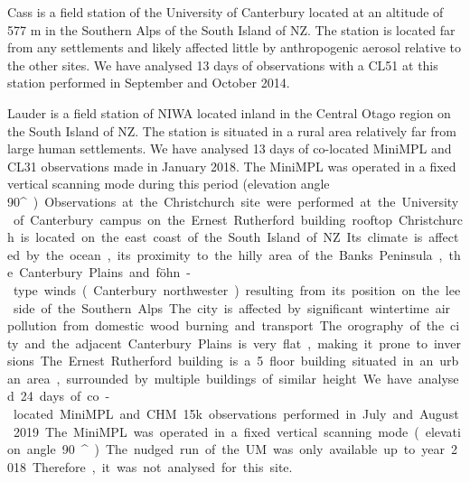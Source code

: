 \begin{table}[t]
\caption[Location of sites and instruments]{Location of sites and instruments. The time periods are inclusive.}
\label{tab:3:case-studies}
\centering
{}
\end{table}

Cass is a field station of the University of Canterbury
located at an altitude of 577 m in the Southern Alps
of the South Island of NZ. The station is located far from any 
settlements and likely affected little by anthropogenic aerosol relative to the
other sites. We have analysed
13 days of observations with a CL51 at this station performed in September
and October 2014.

Lauder is a field station of NIWA located
inland in the Central Otago region on the South Island of NZ.
The station is situated in a rural area relatively far from large human
settlements. We have analysed 13 days of co-located MiniMPL and CL31
observations made in January 2018. The MiniMPL was operated in a fixed
vertical scanning mode during this period (elevation angle 90\unit{^\circ}).

Observations at the Christchurch site were performed at the
University of Canterbury campus on the Ernest Rutherford building rooftop.
Christchurch is located on the east coast of the South Island of NZ.
Its climate is affected by the ocean, its proximity to the hilly area
of the Banks Peninsula, the Canterbury Plains and föhn-type winds (Canterbury northwester)
resulting from its position on the lee side of the Southern Alps. The city is affected by
significant wintertime air pollution from domestic wood burning and transport.
The orography of the city and the adjacent Canterbury Plains is very flat,
making it prone to inversions. The Ernest Rutherford building is a 5 floor
building situated in an urban area, surrounded by multiple buildings of similar
height. We have analysed 24 days of co-located MiniMPL and CHM 15k observations
performed in July and August 2019. The MiniMPL was operated in a fixed vertical
scanning mode (elevation angle 90\unit{^\circ}).
The nudged run of the UM was only available up to year 2018. Therefore,
it was not analysed for this site.

